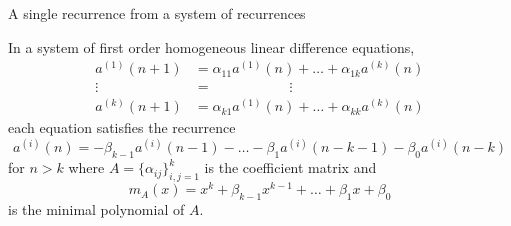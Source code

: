 \documentclass{beamer}%
\begin{document}
\begin{frame}{A single recurrence from a system of recurrences}
  \begin{corollary}
    In a system of first order homogeneous linear difference equations, \begin{align*}
      a^{(1)}(n+1) &= \alpha_{11}a^{(1)}(n) + \hdots + \alpha_{1k}a^{(k)}(n) \\
      \vdots\hspace{25pt} &= \hspace{66pt}\vdots  \\
      a^{(k)}(n+1) &= \alpha_{k1}a^{(1)}(n) + \hdots + \alpha_{kk}a^{(k)}(n)
    \end{align*} each equation satisfies the recurrence \[
      a^{(i)}(n) = -\beta_{k-1}a^{(i)}(n-1) - \hdots -\beta_{1}a^{(i)}(n-k-1) - \beta_0 a^{(i)}(n-k)
    \] for $n > k$ where $A = \{\alpha_{ij}\}_{i,j=1}^k$ is the coefficient matrix and \[
      m_A(x) = x^k + \beta_{k-1}x^{k-1} + \hdots + \beta_1 x + \beta_0
    \] is the minimal polynomial of $A$.
  \end{corollary}
\end{frame}
\end{document}

